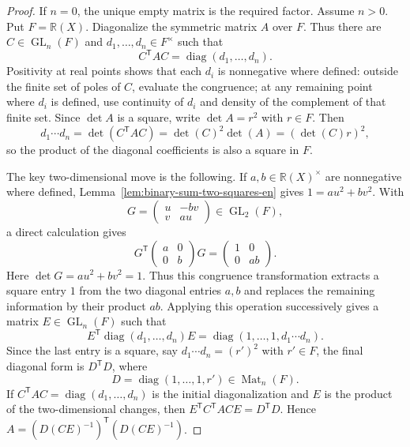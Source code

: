 \documentclass[uplatex,dvipdfmx]{jsarticle}
\newcommand{\Frac}{\mathbb{R}(X)}
\newcommand{\Mat}{\operatorname{Mat}}
\theoremstyle{matrixsosdefinition}
\begin{document}
\begin{proof}
  If \(n=0\), the unique empty matrix is the required factor.  Assume \(n>0\).
  Put \(F=\Frac\). Diagonalize the symmetric matrix \(A\) over \(F\). Thus
  there are \(C\in\operatorname{GL}_n(F)\) and
  \(d_1,\ldots,d_n\in F^\times\) such that
  \[
    C^{\mathsf T}AC=\operatorname{diag}(d_1,\ldots,d_n).
  \]
  Positivity at real points shows that each \(d_i\) is nonnegative where
  defined: outside the finite set of poles of \(C\), evaluate the congruence;
  at any remaining point where \(d_i\) is defined, use continuity of \(d_i\)
  and density of the complement of that finite set. Since \(\det A\) is a square, write \(\det A=r^2\) with \(r\in F\).
  Then
  \[
    d_1\cdots d_n
    =\det(C^{\mathsf T}AC)
    =\det(C)^2\det(A)
    =(\det(C)r)^2,
  \]
  so the product of the diagonal coefficients is also a square in \(F\).

  The key two-dimensional move is the following. If \(a,b\in\Frac^\times\) are
  nonnegative where defined, Lemma~\ref{lem:binary-sum-two-squares-en} gives
  \(1=au^2+bv^2\). With
  \[
    G=
    \begin{pmatrix}u&-bv\\ v&au\end{pmatrix}\in\operatorname{GL}_2(F),
  \]
  a direct calculation gives
  \[
    G^{\mathsf T}
    \begin{pmatrix}a&0\\0&b\end{pmatrix}
    G
    =
    \begin{pmatrix}1&0\\0&ab\end{pmatrix}.
  \]
  Here \(\det G=a u^2+b v^2=1\).  Thus this congruence transformation
  extracts a square entry \(1\) from the two diagonal entries \(a,b\) and
  replaces the remaining information by their product \(ab\). Applying this
  operation successively gives a matrix \(E\in\operatorname{GL}_n(F)\) such that
  \[
    E^{\mathsf T}\operatorname{diag}(d_1,\ldots,d_n)E
    =
    \operatorname{diag}(1,\ldots,1,d_1\cdots d_n).
  \]
  Since the last entry is a square, say \(d_1\cdots d_n=(r')^2\) with
  \(r'\in F\), the final diagonal form is \(D^{\mathsf T}D\), where
  \[
    D=\operatorname{diag}(1,\ldots,1,r')\in\Mat_n(F).
  \]
  If \(C^{\mathsf T}AC=\operatorname{diag}(d_1,\ldots,d_n)\) is the initial
  diagonalization and \(E\) is the product of the two-dimensional changes, then
  \(E^{\mathsf T}C^{\mathsf T}ACE=D^{\mathsf T}D\). Hence
  \(A=(D(CE)^{-1})^{\mathsf T}(D(CE)^{-1})\).
\end{proof}
\end{document}
